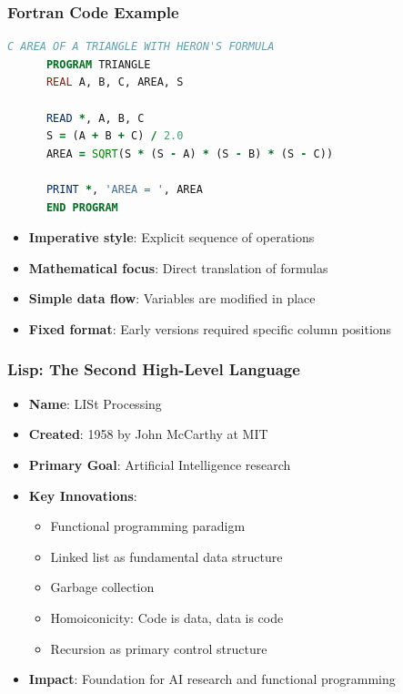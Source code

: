 \documentclass{beamer}
\begin{document}
\begin{frame}[fragile,t]
\frametitle{Fortran Code Example}
\scriptsize
\begin{lstlisting}[language=Fortran, caption=Fortran 77 Style]
C AREA OF A TRIANGLE WITH HERON'S FORMULA
      PROGRAM TRIANGLE
      REAL A, B, C, AREA, S
      
      READ *, A, B, C
      S = (A + B + C) / 2.0
      AREA = SQRT(S * (S - A) * (S - B) * (S - C))
      
      PRINT *, 'AREA = ', AREA
      END PROGRAM
\end{lstlisting}

\begin{itemize}
    \item \textbf{Imperative style}: Explicit sequence of operations
    \item \textbf{Mathematical focus}: Direct translation of formulas
    \item \textbf{Simple data flow}: Variables are modified in place
    \item \textbf{Fixed format}: Early versions required specific column positions
\end{itemize}
\end{frame}

\begin{frame}[t]
\frametitle{Lisp: The Second High-Level Language}
\begin{itemize}
    \item \textbf{Name}: LISt Processing
    \item \textbf{Created}: 1958 by John McCarthy at MIT
    \item \textbf{Primary Goal}: Artificial Intelligence research
    \item \textbf{Key Innovations}:
    \begin{itemize}
        \item Functional programming paradigm
        \item Linked list as fundamental data structure
        \item Garbage collection
        \item Homoiconicity: Code is data, data is code
        \item Recursion as primary control structure
    \end{itemize}
    \item \textbf{Impact}: Foundation for AI research and functional programming
\end{itemize}

\end{frame}
\end{document}
